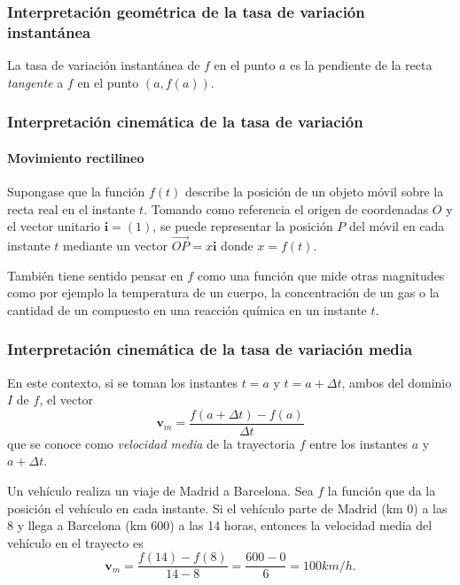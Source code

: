 \begin{frame}
	\frametitle{Interpretación geométrica de la tasa de variación instantánea}
	La tasa de variación instantánea de $f$ en el punto $a$ es la pendiente de la recta \emph{tangente} a $f$ en el punto $(a,f(a))$.
	\begin{center}
		\scalebox{1}{}
	\end{center}
\end{frame}


\begin{frame}
	\frametitle{Interpretación cinemática de la tasa de variación}
	\framesubtitle{Movimiento rectilineo}
	Supongase que la función $f(t)$ describe la posición de un objeto móvil sobre la recta real en el instante $t$.
	Tomando como referencia el origen de coordenadas $O$ y el vector unitario $\mathbf{i}=(1)$, se puede representar la
	posición $P$ del móvil en cada instante $t$ mediante un vector $\vec{OP}=x\mathbf{i}$ donde $x=f(t)$.
	\begin{center}
		\scalebox{1}{}
	\end{center}
	
	También tiene sentido pensar en $f$ como una función que mide otras magnitudes como por ejemplo la temperatura de un
	cuerpo, la concentración de un gas o la cantidad de un compuesto en una reacción química en un instante $t$.
\end{frame}


\begin{frame}
	\frametitle{Interpretación cinemática de la tasa de variación media}
	En este contexto, si se toman los instantes $t=a$ y $t=a+\Delta t$, ambos del dominio $I$ de $f$, el vector
	\[
		\mathbf{v}_m=\frac{f(a+\Delta t)-f(a)}{\Delta t}
	\]
	que se conoce como \emph{velocidad media} de la trayectoria $f$ entre los instantes $a$ y $a+\Delta t$.
	
	Un vehículo realiza un viaje de Madrid a Barcelona.
	Sea $f$ la función que da la posición el vehículo en cada instante.
	Si el vehículo parte de Madrid (km 0) a las 8 y llega a Barcelona (km 600) a las 14 horas, entonces la velocidad media
	del vehículo en el trayecto es
	\[
		\mathbf{v}_m=\frac{f(14)-f(8)}{14-8}=\frac{600-0}{6} = 100 km/h.
	\]
\end{frame}


